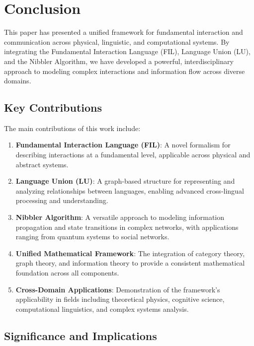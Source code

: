 
\section{Conclusion}

This paper has presented a unified framework for fundamental interaction and communication across physical, linguistic, and computational systems. By integrating the Fundamental Interaction Language (FIL), Language Union (LU), and the Nibbler Algorithm, we have developed a powerful, interdisciplinary approach to modeling complex interactions and information flow across diverse domains.

\subsection{Key Contributions}

The main contributions of this work include:

\begin{enumerate}
    \item \textbf{Fundamental Interaction Language (FIL)}: A novel formalism for describing interactions at a fundamental level, applicable across physical and abstract systems.
    \item \textbf{Language Union (LU)}: A graph-based structure for representing and analyzing relationships between languages, enabling advanced cross-lingual processing and understanding.
    \item \textbf{Nibbler Algorithm}: A versatile approach to modeling information propagation and state transitions in complex networks, with applications ranging from quantum systems to social networks.
    \item \textbf{Unified Mathematical Framework}: The integration of category theory, graph theory, and information theory to provide a consistent mathematical foundation across all components.
    \item \textbf{Cross-Domain Applications}: Demonstration of the framework's applicability in fields including theoretical physics, cognitive science, computational linguistics, and complex systems analysis.
\end{enumerate}

\subsection{Significance and Implications}

